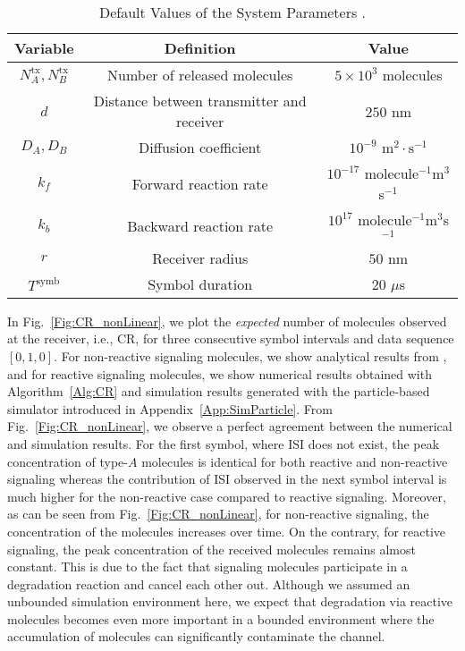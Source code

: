 \documentclass[conference]{IEEEtran}
\begin{document}
\begin{table}
\label{Table:Parameter}
\caption{Default Values of the System Parameters \cite{Adam_Enzyme,Nariman_Acid}. \vspace{-0.2cm}} 
\begin{center}
\scalebox{0.6}
{
\begin{tabular}{|| c | c | c ||}
  \hline 
  Variable & Definition & Value \\ \hline \hline
       $N^{\mathrm{tx}}_A,N^{\mathrm{tx}}_B$ & Number of released molecules  & $5\times 10^3$ molecules \\ \hline      
        $d$ &  Distance between  transmitter and  receiver  & $250$ nm\\ \hline 
         $D_A,D_B$ &  Diffusion coefficient& $ 10^{-9}$ $\text{m}^2\cdot\text{s}^{-1}$\\ \hline          
       $k_f$ &  Forward reaction rate  & $10^{-17}$  molecule$^{-1}$m$^3$s$^{-1}$\\   \hline
       $k_b$ &  Backward reaction rate  & $10^{17}$  molecule$^{-1}$m$^3$s$^{-1}$\\   \hline
              $r$ & Receiver radius   & $50$ nm \\    \hline 
       $T^{\mathrm{symb}}$ &  Symbol duration  & $20$  $\mu$s\\   \hline
\end{tabular}
}
\end{center}\vspace{-0.6cm}
\end{table}

In Fig.~\ref{Fig:CR_nonLinear}, we plot the \textit{expected} number of molecules observed at the receiver, i.e., CR, for three consecutive symbol intervals and data sequence  $[0,1,0]$. For non-reactive signaling molecules, we show analytical results from \cite[Eq.~(1) and (2)]{TCOM_MC_CSI},  and for reactive signaling molecules, we show numerical results obtained with Algorithm~\ref{Alg:CR}  and simulation results generated with the particle-based simulator introduced in Appendix~\ref{App:SimParticle}. From Fig.~\ref{Fig:CR_nonLinear}, we observe a perfect agreement between the numerical and simulation results. For the first symbol, where  ISI does not exist, the peak concentration of type-$A$ molecules is identical for both reactive and non-reactive signaling whereas the contribution of ISI observed in the next symbol interval is much higher for the non-reactive case compared to reactive signaling.  Moreover, as can be seen from Fig.~\ref{Fig:CR_nonLinear},  for non-reactive signaling, the concentration of the molecules increases over time. On the contrary, for reactive signaling, the peak concentration of the received molecules remains almost constant. This is due to the fact that signaling molecules participate in a degradation reaction and cancel each other out. Although  we assumed an unbounded simulation environment here, we expect that degradation via reactive molecules becomes even more important in a bounded environment where the accumulation of molecules can significantly contaminate the channel. 
\end{document}
